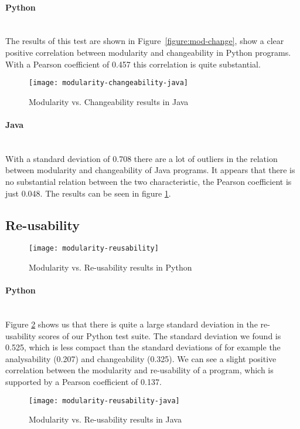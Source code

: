 \documentclass[twoside]{uva-inf-bachelor-thesis}
\newcommand{\myparagraph}[1]{\paragraph{#1}\mbox{}\\}
\begin{document}
\myparagraph{Python}
The results of this test are shown in Figure~\ref{figure:mod-change},  show a clear positive correlation between modularity and changeability in Python programs. With a Pearson coefficient of 0.457 this correlation is  quite substantial.

\begin{figure}[H]
    \caption{Modularity vs. Changeability results in Java}
    \label{figure:mod-change-java}
    \centering
        \texttt{[image: modularity-changeability-java]}
\end{figure}

\myparagraph{Java}
With a standard deviation of 0.708 there are a  lot of outliers in the relation between modularity and changeability of Java programs. It appears that there is no substantial relation between the two characteristic, the Pearson coefficient is just 0.048. The results can be seen in figure \ref{figure:mod-change-java}.

\subsection{Re-usability}

\begin{figure}[H]
    \caption{Modularity vs. Re-usability results in Python}
    \label{figure:mod-reuse}
    \centering
        \texttt{[image: modularity-reusability]}
\end{figure}

\myparagraph{Python}
Figure \ref{figure:mod-reuse} shows us that there is quite  a large standard deviation in the re-usability scores of our Python test suite. The standard deviation we found is 0.525, which is less compact than the standard deviations of for example the analysability (0.207) and changeability (0.325). We can see a slight positive correlation between the modularity and re-usability of a program, which is supported by a Pearson coefficient of 0.137.

\begin{figure}[H]
    \caption{Modularity vs. Re-usability results in Java}
    \label{figure:mod-reuse-java}
    \centering
        \texttt{[image: modularity-reusability-java]}
\end{figure}
\end{document}
